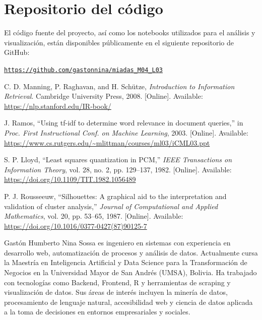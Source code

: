 \documentclass[journal]{IEEEtran}
\begin{document}
\section*{Repositorio del código}

El código fuente del proyecto, así como los notebooks utilizados para el análisis y visualización, están disponibles públicamente en el siguiente repositorio de GitHub:

\noindent\texttt{\url{https://github.com/gastonnina/miadas_M04_L03}}


\renewcommand{\refname}{Referencias}

\begin{thebibliography}{9}

C. D. Manning, P. Raghavan, and H. Schütze, \textit{Introduction to Information Retrieval}. Cambridge University Press, 2008. [Online]. Available: \url{https://nlp.stanford.edu/IR-book/}

J. Ramos, “Using tf-idf to determine word relevance in document queries,” in \textit{Proc. First Instructional Conf. on Machine Learning}, 2003. [Online]. Available: \url{https://www.cs.rutgers.edu/~mlittman/courses/ml03/iCML03.ppt}

S. P. Lloyd, “Least squares quantization in PCM,” \textit{IEEE Transactions on Information Theory}, vol. 28, no. 2, pp. 129–137, 1982. [Online]. Available: \url{https://doi.org/10.1109/TIT.1982.1056489}

P. J. Rousseeuw, “Silhouettes: A graphical aid to the interpretation and validation of cluster analysis,” \textit{Journal of Computational and Applied Mathematics}, vol. 20, pp. 53–65, 1987. [Online]. Available: \url{https://doi.org/10.1016/0377-0427(87)90125-7}

\end{thebibliography}

\begin{IEEEbiography}{Gastón Humberto Nina Sossa}
es ingeniero en sistemas con experiencia en desarrollo web, automatización de procesos y análisis de datos. Actualmente cursa la Maestría en Inteligencia Artificial y Data Science para la Transformación de Negocios en la Universidad Mayor de San Andrés (UMSA), Bolivia. Ha trabajado con tecnologías como Backend, Frontend, R y herramientas de scraping y visualización de datos. Sus áreas de interés incluyen la minería de datos, procesamiento de lenguaje natural, accesibilidad web y ciencia de datos aplicada a la toma de decisiones en entornos empresariales y sociales.
\end{IEEEbiography}
\end{document}
